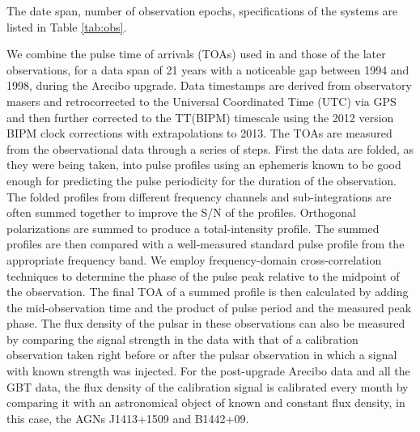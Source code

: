 {The date span, number of observation epochs, specifications of the
systems are listed in Table \ref{tab:obs}. }

We combine the pulse time of arrivals (TOAs) used in \citealt{sns+05} and those
of the later observations, for a data span of 21 years with a
noticeable gap between 1994 and 1998, during the Arecibo upgrade.
Data timestamps are derived from observatory masers and retrocorrected
to the Universal Coordinated Time (UTC) via GPS and then further
corrected to the TT(BIPM) timescale using the 2012 version BIPM clock corrections with extrapolations to 2013.
The TOAs are measured from the observational data through a series of
steps. First the data are folded, as they were being taken, into pulse
profiles using an ephemeris known to be good enough for predicting the
pulse periodicity for the duration of the observation. The folded
profiles from different frequency channels and sub-integrations are
often summed together to improve the S/N of the profiles.  Orthogonal
polarizations are summed to produce a total-intensity profile.
The summed profiles are then compared with a well-measured standard
pulse profile from the appropriate frequency band. We employ
frequency-domain cross-correlation techniques \citep{tay92} to determine the phase of the pulse peak relative to the midpoint of the observation. The final TOA of a summed profile is then calculated by adding the mid-observation time and the product of pulse period and the measured peak phase.
The flux density of the pulsar in these observations can also be
measured by comparing the signal strength in the data with that of a
calibration observation taken right before or after the pulsar
observation in which a signal with known strength was injected. For
the post-upgrade Arecibo data and all the GBT data, the
flux density of the calibration signal is calibrated every month by
comparing it with an astronomical object of known and constant flux
density, in this case, the AGNs J1413+1509 and B1442+09.


